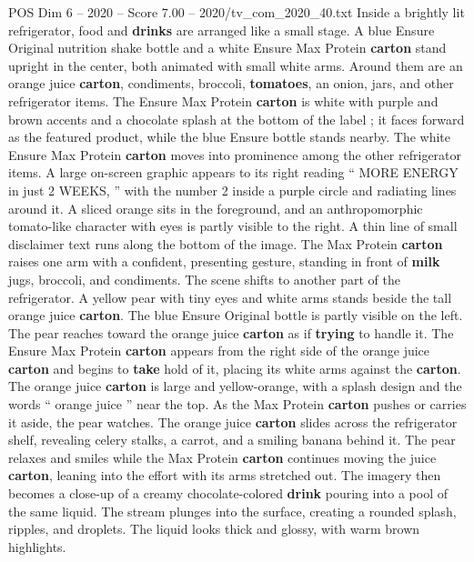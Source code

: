 \begin{textsample}{POS Dim 6 – 2020 – Score 7.00 – 2020/tv\_com\_2020\_40.txt}  \label{ex:f6_pos_066}
Inside a brightly lit refrigerator, food and \textbf{drinks} are arranged like a small stage.
A blue Ensure Original nutrition shake bottle and a white Ensure Max Protein \textbf{carton} stand upright in the center, both animated with small white arms.
Around them are an orange juice \textbf{carton}, condiments, broccoli, \textbf{tomatoes}, an onion, jars, and other refrigerator items.
The Ensure Max Protein \textbf{carton} is white with purple and brown accents and a chocolate splash at the bottom of the label ; it faces forward as the featured product, while the blue Ensure bottle stands nearby.
The white Ensure Max Protein \textbf{carton} moves into prominence among the other refrigerator items.
A large on-screen graphic appears to its right reading “ MORE ENERGY in just 2 WEEKS, ” with the number 2 inside a purple circle and radiating lines around it.
A sliced orange sits in the foreground, and an anthropomorphic tomato-like character with eyes is partly visible to the right.
A thin line of small disclaimer text runs along the bottom of the image.
The Max Protein \textbf{carton} raises one arm with a confident, presenting gesture, standing in front of \textbf{milk} jugs, broccoli, and condiments.
The scene shifts to another part of the refrigerator.
A yellow pear with tiny eyes and white arms stands beside the tall orange juice \textbf{carton}.
The blue Ensure Original bottle is partly visible on the left.
The pear reaches toward the orange juice \textbf{carton} as if \textbf{trying} to handle it.
The Ensure Max Protein \textbf{carton} appears from the right side of the orange juice \textbf{carton} and begins to \textbf{take} hold of it, placing its white arms against the \textbf{carton}.
The orange juice \textbf{carton} is large and yellow-orange, with a splash design and the words “ orange juice ” near the top.
As the Max Protein \textbf{carton} pushes or carries it aside, the pear watches.
The orange juice \textbf{carton} slides across the refrigerator shelf, revealing celery stalks, a carrot, and a smiling banana behind it.
The pear relaxes and smiles while the Max Protein \textbf{carton} continues moving the juice \textbf{carton}, leaning into the effort with its arms stretched out.
The imagery then becomes a close-up of a creamy chocolate-colored \textbf{drink} pouring into a pool of the same liquid.
The stream plunges into the surface, creating a rounded splash, ripples, and droplets.
The liquid looks thick and glossy, with warm brown highlights.

\end{textsample}
